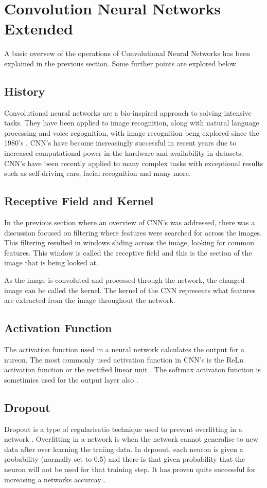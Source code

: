 \section{Convolution Neural Networks Extended}
A basic overvew of the operations of Convolutional Neural Networks has been explained in the previous section. Some further points are explored below.

\subsection*{History}
Convolutional neural networks are a bio-inspired approach to solving intensive tasks.
They have been applied to image recognition, along with natural language processing and voice regognition, with image recognition beng explored since the 1980's \textcite{handsOnML}.
CNN's have become increasingly successful in recent years due to increased computational power in the hardware and availability in datasets. CNN's have been recently applied to many complex tasks with exceptional results such as self-driving cars, facial recognition and many more.

\subsection*{Receptive Field and Kernel}
In the previous section where an overview of CNN's was addressed, there was a discussion focused on filtering where features were searched for across the images.
This filtering resulted in windows sliding across the image, looking for common features.
This window is called the receptive field and this is the section of the image that is being looked at.

As the image is convoluted and processed through the network, the changed image can be called the kernel.
The kernel of the CNN represents what features are extracted from the image throughout the network.

\subsection*{Activation Function}
The activation function used in a neural network calculates the output for a nureon.
The most commonly used activation function in CNN's is the ReLu activation function or the rectified linear unit \textcite{handsOnML}.
The softmax activaton function is sometimies used for the output layer also \textcite{handOnML}.

\subsection*{Dropout}
Dropout is a type of regularisatio technique used to prevent overfitting in a network \textcite{handOnML}.
Overfitting in a network is when the network cannot generalise to new data after over learning the traiing data.
In drpoout, each neuron is given a probability (normally set to 0.5) and there is that given probability that the neuron will not be used for that training step.
It has proven quite successful for increasing a networks accurcay \textcite{handOnML}.

